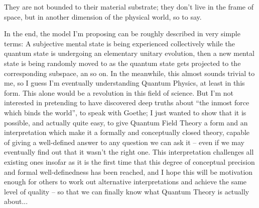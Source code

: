 They are not bounded to their material substrate; they don't live in the frame of space, but in another dimension of the physical world, so to say.

In the end, the model I'm proposing can be roughly described in very simple terms: A subjective mental state is being experienced collectively while the quantum state is undergoing an elementary unitary evolution, then a new mental state is being randomly moved to as the quantum state gets projected to the corresponding subspace, an so on. In the meanwhile, this almost sounds trivial to me, so I guess I'm eventually understanding Quantum Physics, at least in this form. This alone would be a revolution in this field of science. But I'm not interested in pretending to have discovered deep truths about ``the inmost force which binds the world'', to speak with Goethe; I just wanted to show that it is possible, and actually quite easy, to give Quantum Field Theory a form and an interpretation which make it a formally and conceptually closed theory, capable of giving a well-defined answer to any question we can ask it -- even if we may eventually find out that it wasn't the right one. This interpretation challenges all existing ones insofar as it is the first time that this degree of conceptual precision and formal well-definedness has been reached, and I hope this will be motivation enough for others to work out alternative interpretations and achieve the same level of quality -- so that we can finally know what Quantum Theory is actually about...
